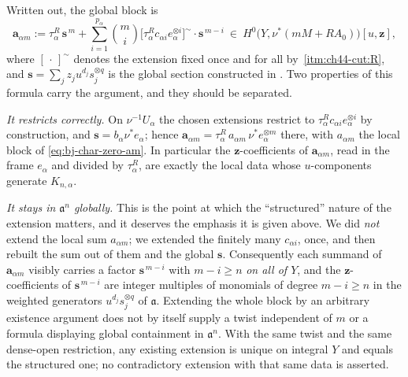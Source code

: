 Written out, the global block is
\[
 \mathbf a_{\alpha m}
 :=\tau_\alpha^R\,\mathbf s^{\,m}
   +\sum_{i=1}^{p_\alpha}\binom mi
     \bigl[\tau_\alpha^Rc_{\alpha i}e_\alpha^{\otimes i}\bigr]^{\sim}
     \cdot\mathbf s^{\,m-i}
 \ \in\ H^0\bigl(Y,\nu^*(mM+RA_0)\bigr)[u,\mathbf z],
\]
where $[\,\cdot\,]^{\sim}$ denotes the extension fixed once and for all by
\,\cref{itm:ch44-cut:R}, and
$\mathbf s=\sum_jz_ju^{d_j}s_j^{\otimes q}$ is the global section
constructed in .  Two properties of this formula
carry the argument, and they should be separated.

\emph{It restricts correctly.}  On $\nu^{-1}U_\alpha$ the chosen
extensions restrict to $\tau_\alpha^Rc_{\alpha i}e_\alpha^{\otimes i}$ by
construction, and $\mathbf s=b_\alpha\nu^*e_\alpha$; hence
$\mathbf a_{\alpha m}=\tau_\alpha^R\,a_{\alpha m}\,\nu^*e_\alpha^{\otimes m}$
there, with $a_{\alpha m}$ the local block of
\eqref{eq:bj-char-zero-am}.  In particular the $\mathbf z$-coefficients of
$\mathbf a_{\alpha m}$, read in the frame $e_\alpha$ and divided by
$\tau_\alpha^R$, are exactly the local data whose $u$-components
generate $K_{n,\alpha}$.

\emph{It stays in $\mathfrak a^n$ globally.}  This is the point at which
the ``structured'' nature of the extension matters, and it deserves the
emphasis it is given above.  We did \emph{not} extend the local sum
$a_{\alpha m}$; we extended the finitely many $c_{\alpha i}$, once, and
then rebuilt the sum out of them and the global $\mathbf s$.  Consequently
each summand of $\mathbf a_{\alpha m}$ visibly carries a factor
$\mathbf s^{\,m-i}$ with $m-i\ge n$ \emph{on all of $Y$}, and the
$\mathbf z$-coefficients of $\mathbf s^{\,m-i}$ are integer multiples of
monomials of degree $m-i\ge n$ in the weighted generators
$u^{d_j}s_j^{\otimes q}$ of $\mathfrak a$.  Extending the whole block by an arbitrary existence argument does not
by itself supply a twist independent of $m$ or a formula displaying
global containment in $\mathfrak a^n$.  With the same twist and the
same dense-open restriction, any existing extension is unique on
integral $Y$ and equals the structured one; no contradictory extension
with that same data is asserted.

